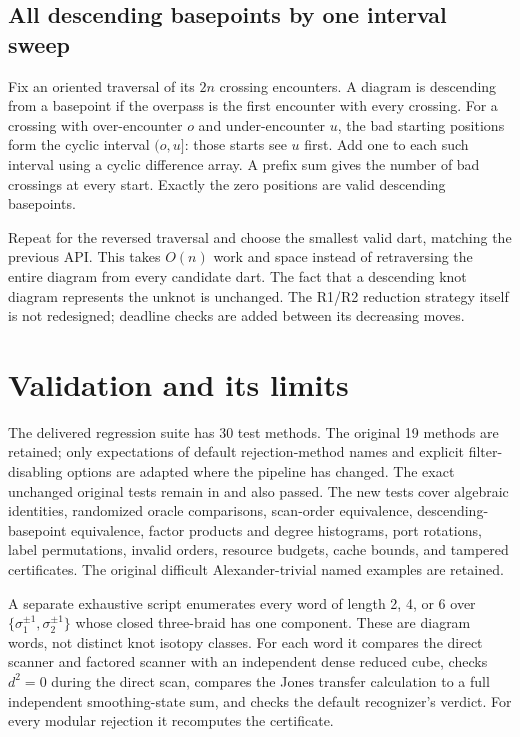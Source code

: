 \documentclass[11pt,letterpaper]{article}
\theoremstyle{definition}\newtheorem{definition}[theorem]{Definition}
\theoremstyle{remark}\newtheorem{remark}[theorem]{Remark}
\newcommand{\code}[1]{\texttt{\detokenize{#1}}}
\begin{document}
\subsection{All descending basepoints by one interval sweep}

Fix an oriented traversal of its $2n$ crossing encounters. A diagram is descending
from a basepoint if the overpass is the first encounter with every crossing.
For a crossing with over-encounter $o$ and under-encounter $u$, the bad starting
positions form the cyclic interval $(o,u]$: those starts see $u$ first. Add one
to each such interval using a cyclic difference array. A prefix sum gives the
number of bad crossings at every start. Exactly the zero positions are valid
descending basepoints.

Repeat for the reversed traversal and choose the smallest valid dart, matching
the previous API. This takes $O(n)$ work and space instead of retraversing the
entire diagram from every candidate dart. The fact that a descending knot
diagram represents the unknot is unchanged. The R1/R2 reduction strategy itself
is not redesigned; deadline checks are added between its decreasing moves.

\section{Validation and its limits}

The delivered regression suite has 30 test methods. The original 19 methods are
retained; only expectations of default rejection-method names and explicit
filter-disabling options are adapted where the pipeline has changed. The exact
unchanged original tests remain in \code{baseline/tests/} and also passed.
The new tests cover algebraic identities, randomized oracle comparisons,
scan-order equivalence, descending-basepoint equivalence, factor products and
degree histograms, port rotations, label permutations, invalid orders, resource
budgets, cache bounds, and tampered certificates. The original difficult
Alexander-trivial named examples are retained.

A separate exhaustive script enumerates every word of length 2, 4, or 6 over
$\{\sigma_1^{\pm1},\sigma_2^{\pm1}\}$ whose closed three-braid has one component.
These are diagram words, not distinct knot isotopy classes. For each word it
compares the direct scanner and factored scanner with an independent dense
reduced cube, checks $d^2=0$ during the direct scan, compares the Jones transfer
calculation to a full independent smoothing-state sum, and checks the default
recognizer's verdict. For every modular rejection it recomputes the certificate.
\end{document}
